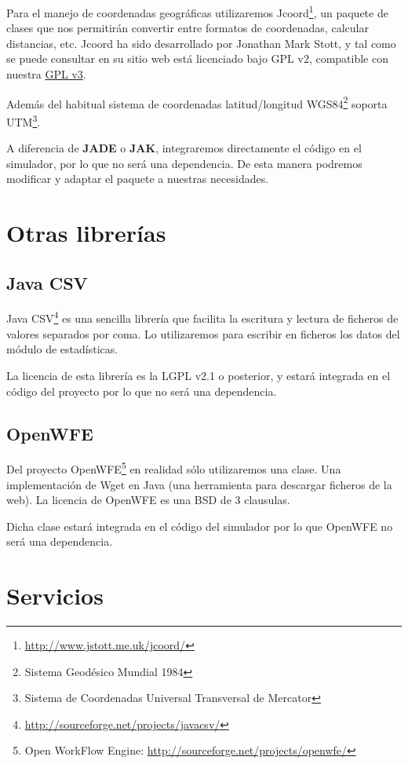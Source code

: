Para el manejo de coordenadas geográficas utilizaremos
Jcoord\footnote{\url{http://www.jstott.me.uk/jcoord/}}, un paquete de clases que
nos permitirán convertir entre formatos de coordenadas, calcular distancias,
etc. Jcoord ha sido desarrollado por Jonathan Mark Stott, y tal como se puede
consultar en su sitio web está licenciado bajo GPL v2, compatible con nuestra
\hyperref[ap1]{GPL v3}.

Además del habitual sistema de coordenadas latitud/longitud
WGS84\footnote{Sistema Geodésico Mundial 1984} soporta UTM\footnote{Sistema de
Coordenadas Universal Transversal de Mercator}.

A diferencia de {\bf JADE} o {\bf JAK}, integraremos directamente el código en
el simulador, por lo que no será una dependencia. De esta manera podremos
modificar y adaptar el paquete a nuestras necesidades.

\section*{Otras librerías}

\subsection*{Java CSV}

Java CSV\footnote{\url{http://sourceforge.net/projects/javacsv/}} es una
sencilla librería que facilita la escritura y lectura de ficheros de valores
separados por coma. Lo utilizaremos para escribir en ficheros los datos del
módulo de estadísticas.

La licencia de esta librería es la LGPL v2.1 o posterior, y estará integrada en
el código del proyecto por lo que no será una dependencia.

\subsection*{OpenWFE}

Del proyecto OpenWFE\footnote{Open WorkFlow Engine:
\url{http://sourceforge.net/projects/openwfe/}} en realidad sólo utilizaremos
una clase. Una implementación de Wget en Java (una herramienta para descargar
ficheros de la web). La licencia de OpenWFE es una BSD de 3 clausulas.

Dicha clase estará integrada en el código del simulador por lo que OpenWFE no
será una dependencia.

\section*{Servicios}

